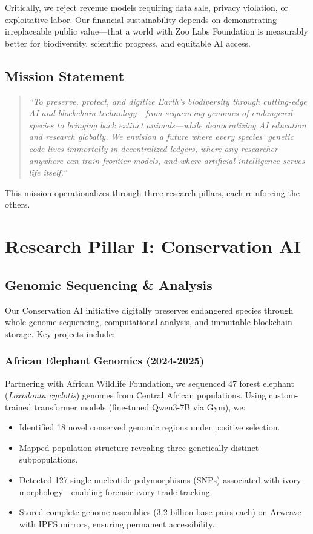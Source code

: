 \documentclass[twocolumn,11pt]{article}
\begin{document}
Critically, we reject revenue models requiring data sale, privacy violation, or exploitative labor. Our financial sustainability depends on demonstrating irreplaceable public value—that a world with Zoo Labs Foundation is measurably better for biodiversity, scientific progress, and equitable AI access.

\subsection{Mission Statement}

\begin{quote}
\textit{``To preserve, protect, and digitize Earth's biodiversity through cutting-edge AI and blockchain technology—from sequencing genomes of endangered species to bringing back extinct animals—while democratizing AI education and research globally. We envision a future where every species' genetic code lives immortally in decentralized ledgers, where any researcher anywhere can train frontier models, and where artificial intelligence serves life itself.''}
\end{quote}

This mission operationalizes through three research pillars, each reinforcing the others.

\section{Research Pillar I: Conservation AI}

\subsection{Genomic Sequencing \& Analysis}

Our Conservation AI initiative digitally preserves endangered species through whole-genome sequencing, computational analysis, and immutable blockchain storage. Key projects include:

\subsubsection{African Elephant Genomics (2024-2025)}
Partnering with African Wildlife Foundation, we sequenced 47 forest elephant (\textit{Loxodonta cyclotis}) genomes from Central African populations. Using custom-trained transformer models (fine-tuned Qwen3-7B via Gym), we:
\begin{itemize}
    \item Identified 18 novel conserved genomic regions under positive selection.
    \item Mapped population structure revealing three genetically distinct subpopulations.
    \item Detected 127 single nucleotide polymorphisms (SNPs) associated with ivory morphology—enabling forensic ivory trade tracking.
    \item Stored complete genome assemblies (3.2 billion base pairs each) on Arweave with IPFS mirrors, ensuring permanent accessibility.
\end{itemize}
\end{document}
